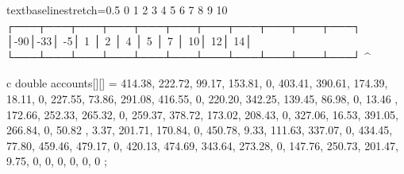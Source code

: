 \documentclass[11pt,a4paper,twoside]{book}
\begin{document}
\begin{code}{text}{}{baselinestretch=0.5}
  0   1   2   3   4   5   6   7   8   9   10
┌───┬───┬───┬───┬───┬───┬───┬───┬───┬───┬───┐
│-90│-33│ -5│ 1 │ 2 │ 4 │ 5 │ 7 │ 10│ 12│ 14│
└───┴───┴───┴───┴───┴───┴───┴───┴───┴───┴───┘
                                ^
\end{code}

\begin{code}{c}{}{}
    double accounts[][] = {
        {414.38, 222.72,  99.17, 153.81, 0},
        {403.41, 390.61, 174.39, 18.11,  0},
        {227.55,  73.86, 291.08, 416.55, 0},
        {220.20, 342.25, 139.45, 86.98,  0},
        {13.46 , 172.66, 252.33, 265.32, 0},
        {259.37, 378.72, 173.02, 208.43, 0},
        {327.06,  16.53, 391.05, 266.84, 0},
        {50.82 ,   3.37, 201.71, 170.84, 0},
        {450.78,   9.33, 111.63, 337.07, 0},
        {434.45,  77.80, 459.46, 479.17, 0},
        {420.13, 474.69, 343.64, 273.28, 0},
        {147.76, 250.73, 201.47, 9.75,   0},
        {  0,      0,      0,    0,      0}
    };
\end{code}
\end{document}
